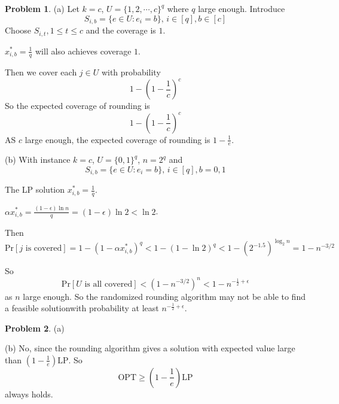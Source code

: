 \documentclass[a4paper]{article}
\theoremstyle{definition}
\newtheorem{problem}{Problem}
\theoremstyle{plain}
\newcommand{\OPT}{\mathrm{OPT}}
\numberwithin{equation}{problem}
\begin{document}
\begin{problem}
  (a) Let  $ k=c $,  $ U=\{1,2,\cdots,c\}^q $ where  $ q $ large enough. Introduce 
  \[S_{i,b}=\{e\in U:e_i=b\}, \,i\in [q],b\in [c]\]
  Choose  $ S_{i,t},1 \leq t \leq c $ and the coverage is  $ 1 $.
  
   $ x_{i,b}^*=\frac{1}{q} $ will also achieves coverage  $ 1 $.  

  Then we cover each  $ j\in U $    with probability 
  \[1-(1-\frac{1}{c})^c\]
  So the expected coverage of rounding is 
  \[1-(1-\frac{1}{c})^c\]
  AS  $ c $ large enough, the expected  coverage of rounding is  $ 1-\frac{1}{e} $.
  
  
  (b) With instance  $ k=c $,  $ U=\{0,1\}^q $,  $ n=2^q $ and 
  \[S_{i,b}=\{e\in U:e_i=b\}, \,i\in [q],b=0,1\]
  
  The LP solution  $ x_{i,b}^*=\frac{1}{q} $. 

   $ \alpha x_{i,b}^*=\frac{(1-\epsilon)\ln n}{q}=(1-\epsilon)\ln 2<\ln 2 $.
   
  Then 
  \[\mathrm{Pr}[j \text{ is covered}]=1-(1-\alpha x_{i,b}^*)^q<1-(1-\ln 2)^q<1-(2^{-1.5})^{\log_2 n}=1-n^{-3/2}\]

  So 
  \[\mathrm{Pr}[U\text{ is all covered}]<(1-n^{-3/2})^n<1-n^{-\frac{1}{2}+\epsilon}\]
  as  $ n $ large enough. So the randomized rounding algorithm may not be able to find a feasible solutionwith probability at least $ n^{-\frac{1}{2}+\epsilon} $. 

\end{problem}

\begin{problem}
  (a)
  

  (b) No, since the rounding algorithm gives a solution with expected value large than  $ (1-\frac{1}{e})\mathrm{LP} $. So 
  \[\OPT \geq (1-\frac{1}{e})\mathrm{LP}\]
  always holds. 
\end{problem}
\end{document}
